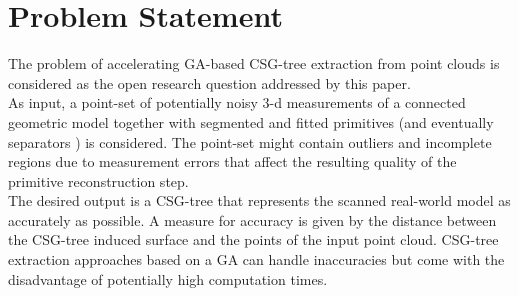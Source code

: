 \section{Problem Statement}
\label{sec:prob}
The problem of accelerating \ac{GA}-based \ac{CSG}-tree extraction from point clouds is considered as the open research question addressed by this paper.
\\
As input, a point-set of potentially noisy $3$-d measurements of a connected geometric model together with segmented and fitted primitives 
(and eventually separators \cite{shapiro1993separation}) 
is considered. 
The point-set might contain outliers and incomplete regions due to measurement errors that affect the resulting quality of the primitive reconstruction step.
\\
The desired output is a \ac{CSG}-tree that represents the scanned real-world model as accurately as possible.
A measure for accuracy is given by the distance between the \ac{CSG}-tree induced surface and the points of the input point cloud.
\ac{CSG}-tree extraction approaches based on a \ac{GA} \cite{fayolle2016evolutionary} can handle 
inaccuracies but come with the disadvantage of potentially high computation times.
